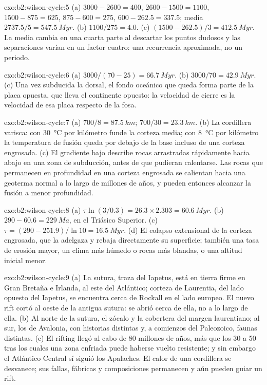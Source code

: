 \begin{solution}{exo:b2:wilson-cycle:5}
(a) $3000 - 2600 = 400$, $2600 - 1500 = 1100$, $1500 - 875 = 625$, $875 - 600 = 275$, $600 -
262.5 = 337.5$; media $2737.5/5 = \qty{547.5}{Myr}$. (b) $1100/275 = 4.0$. (c) $(1500 -
262.5)/3 = \qty{412.5}{Myr}$. La media cambia en una cuarta parte al descartar los puntos dudosos
y las separaciones varían en un factor cuatro: una recurrencia aproximada, no un periodo.
\end{solution}

\begin{solution}{exo:b2:wilson-cycle:6}
(a) $3000/(70 - 25) = \qty{66.7}{Myr}$. (b) $3000/70 = \qty{42.9}{Myr}$. (c) Una vez subducida
la dorsal, el fondo oceánico que queda forma parte de la placa opuesta, que lleva el continente
opuesto: la velocidad de cierre es la velocidad de esa placa respecto de la fosa.
\end{solution}

\begin{solution}{exo:b2:wilson-cycle:7}
(a) $700/8 = \qty{87.5}{km}$; $700/30 = \qty{23.3}{km}$. (b) La cordillera varisca: con
\qty{30}{\celsius} por kilómetro funde la corteza media; con \qty{8}{\celsius} por kilómetro
la temperatura de fusión queda por debajo de la base incluso de una corteza engrosada. (c) El gradiente bajo
describe rocas arrastradas rápidamente hacia abajo en una zona de subducción, antes de que pudieran calentarse. Las rocas que
permanecen en profundidad en una corteza engrosada se calientan hacia una geoterma normal a lo largo de millones de años, y pueden
entonces alcanzar la fusión a menor profundidad.
\end{solution}

\begin{solution}{exo:b2:wilson-cycle:8}
(a) $\tau\ln(3/0.3) = 26.3\times2.303 = \qty{60.6}{Myr}$. (b) $290 - 60.6 = \qty{229}{Ma}$, en
el Triásico Superior. (c) $\tau = (290 - 251.9)/\ln10 = \qty{16.5}{Myr}$. (d) El colapso
extensional de la corteza engrosada, que la adelgaza y rebaja directamente su superficie; también una
tasa de erosión mayor, un clima más húmedo o rocas más blandas, o una altitud inicial menor.
\end{solution}

\begin{solution}{exo:b2:wilson-cycle:9}
(a) La sutura, traza del Iapetus, está en tierra firme en Gran Bretaña e Irlanda, al este del
Atlántico; corteza de Laurentia, del lado opuesto del Iapetus, se encuentra cerca de Rockall en el
lado europeo. El nuevo rift cortó al oeste de la antigua sutura: se abrió cerca de ella, no a lo largo de ella.
(b) Al norte de la sutura, el zócalo y la cobertera del margen laurentiano; al sur, los de
Avalonia, con historias distintas y, a comienzos del Paleozoico, faunas distintas. (c) El rifting
llegó al cabo de 80 millones de años, más que los 30 a 50 tras los cuales una zona enfriada puede haberse vuelto
resistente; y sin embargo el Atlántico Central sí siguió los Apalaches. El calor de una cordillera se desvanece; sus
fallas, fábricas y composiciones permanecen y aún pueden guiar un rift.
\end{solution}

